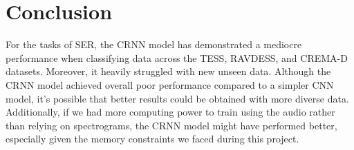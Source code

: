 \documentclass[../main.tex]{subfiles}
\begin{document}
\section{Conclusion}

For the tasks of SER, the CRNN model has demonstrated a mediocre performance when classifying data across the TESS, RAVDESS, and CREMA-D datasets.
Moreover, it heavily struggled with new unseen data. Although the CRNN model achieved overall poor performance compared to a simpler CNN model, it’s
possible that better results could be obtained with more diverse data. Additionally, if we had more computing power to train using the audio
rather than relying on spectrograms, the CRNN model might have performed better, especially given the memory constraints we faced during this project.
\end{document}
